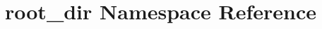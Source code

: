 \hypertarget{namespaceroot__dir}{}\section{root\+\_\+dir Namespace Reference}
\label{namespaceroot__dir}
